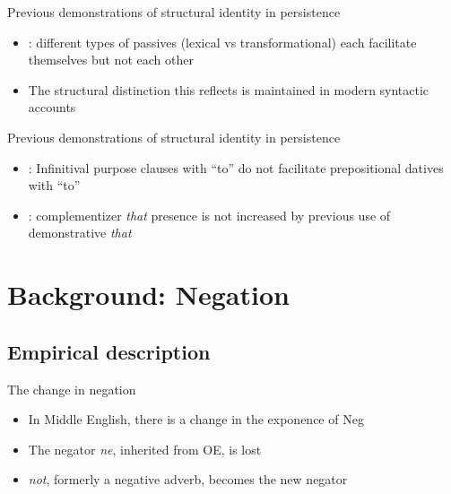 \documentclass{digs-slides}
\newcommand{\includegraph}[1]{\mode<beamer>{}
    \mode<handout>{}}
\begin{document}
\begin{frame}{Previous demonstrations of structural identity in persistence}
	\begin{itemize}
          \item \textcite{Estival:1985}: different types of passives (lexical vs transformational) each facilitate themselves but not each other
          \item The structural distinction this reflects is maintained in modern syntactic accounts \parencite[e.g.][]{Embick:2004}
	\end{itemize}
        \begin{center}
            \includegraph{figures/estival}
        \end{center}
\end{frame}

\begin{frame}{Previous demonstrations of structural identity in persistence}
	\begin{itemize}
          \item \textcite{Bock:1990}: Infinitival purpose clauses with
            “to” do not facilitate prepositional datives with “to”
          \item \textcite{Ferreira:2003}: complementizer \textit{that}
            presence is not increased by previous use of demonstrative \textit{that}
	\end{itemize}
\end{frame}



\section{Background: Negation}

\subsection{Empirical description}
\label{sec:empirical-aspects}

\begin{frame}{The change in negation}
    \begin{itemize}
      \item In Middle English, there is a change in the exponence of Neg
      \item The negator \emph{ne}, inherited from OE, is lost
      \item \emph{not}, formerly a negative adverb, becomes the new negator
    \end{itemize}
\end{frame}
\end{document}
